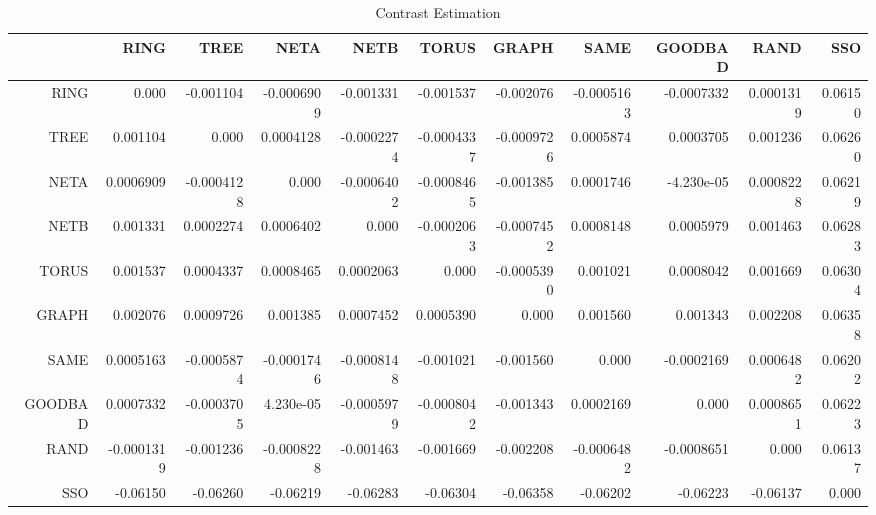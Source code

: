 \documentclass[a4paper,10pt]{article}
\begin{document}
\begin{landscape}
\begin{table}[!htp]
\centering\tiny
\caption{Contrast Estimation}
\begin{tabular}{
|r|r|r|r|r|r|r|r|r|r|r|}
\hline
 & RING& TREE& NETA& NETB& TORUS& GRAPH& SAME& GOODBAD& RAND& SSO\\
\hline
 RING&0.000&-0.001104&-0.0006909&-0.001331&-0.001537&-0.002076&-0.0005163&-0.0007332&0.0001319&0.06150\\
\hline
 TREE&0.001104&0.000&0.0004128&-0.0002274&-0.0004337&-0.0009726&0.0005874&0.0003705&0.001236&0.06260\\
\hline
 NETA&0.0006909&-0.0004128&0.000&-0.0006402&-0.0008465&-0.001385&0.0001746&-4.230e-05&0.0008228&0.06219\\
\hline
 NETB&0.001331&0.0002274&0.0006402&0.000&-0.0002063&-0.0007452&0.0008148&0.0005979&0.001463&0.06283\\
\hline
 TORUS&0.001537&0.0004337&0.0008465&0.0002063&0.000&-0.0005390&0.001021&0.0008042&0.001669&0.06304\\
\hline
 GRAPH&0.002076&0.0009726&0.001385&0.0007452&0.0005390&0.000&0.001560&0.001343&0.002208&0.06358\\
\hline
 SAME&0.0005163&-0.0005874&-0.0001746&-0.0008148&-0.001021&-0.001560&0.000&-0.0002169&0.0006482&0.06202\\
\hline
 GOODBAD&0.0007332&-0.0003705&4.230e-05&-0.0005979&-0.0008042&-0.001343&0.0002169&0.000&0.0008651&0.06223\\
\hline
 RAND&-0.0001319&-0.001236&-0.0008228&-0.001463&-0.001669&-0.002208&-0.0006482&-0.0008651&0.000&0.06137\\
\hline
 SSO&-0.06150&-0.06260&-0.06219&-0.06283&-0.06304&-0.06358&-0.06202&-0.06223&-0.06137&0.000\\
\hline

\end{tabular}
\end{table}

\newpage


\end{landscape}
\end{document}
